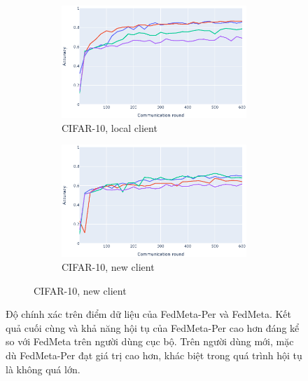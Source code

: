 \documentclass[runningheads]{llncs}
\begin{document}
\begin{figure}[h]
\begin{subfigure}{\textwidth}
\begin{subfigure}{.49\textwidth}
        \end{subfigure}
    \end{subfigure}
    \begin{subfigure}{\textwidth}
        \centering
        \begin{subfigure}{.49\textwidth}
            \includegraphics[width=\linewidth]{img/cifar_old_metaper.eps}
            \caption{CIFAR-10, local client}\label{cifar_old_metaper}
        \end{subfigure}
        \begin{subfigure}{.49\textwidth}
            \includegraphics[width=\linewidth]{img/cifar_new_metaper.eps}
            \caption{CIFAR-10, new client}\label{cifar_new_metaper}
        \end{subfigure}
    \end{subfigure}
    \caption{Độ chính xác trên điểm dữ liệu của FedMeta-Per và FedMeta. Kết quả cuối cùng và khả năng hội tụ của FedMeta-Per cao hơn đáng kể so với FedMeta trên người dùng cục bộ. Trên người dùng mới, mặc dù FedMeta-Per đạt giá trị cao hơn, khác biệt trong quá trình hội tụ là không quá lớn.} \label{fig:fedpermeta_vs_fedmeta}
\end{figure}
\end{document}
